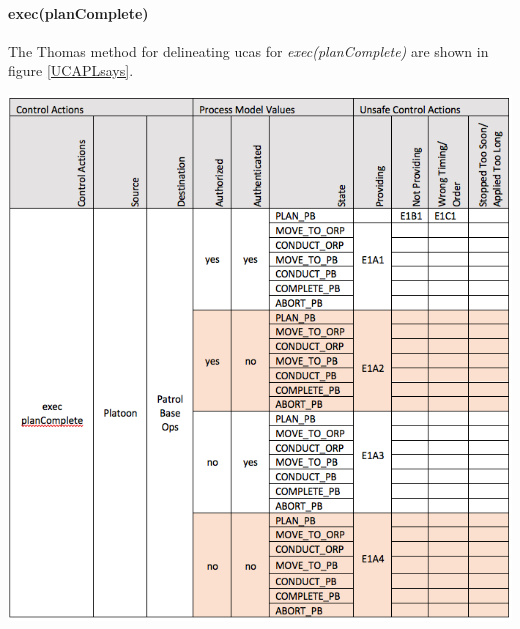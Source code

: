 \documentclass[../../main/main.tex]{subfiles}
\begin{document}
\clearpage
\paragraph*{exec(planComplete)}
The Thomas method for delineating \glspl{uca} for \textit{exec(planComplete)} are shown in figure \ref{UCAPLsays}.
\begin{table}[ht!]
\begin{center}
\includegraphics[width=\linewidth]{../figures/UCAexecplan}
\caption{Unsafe control actions \glspl{uca} for control action "exec(planComplete)."}
\label{UCAexecplan}
\end{center}
\end{table}

\clearpage
\end{document}
